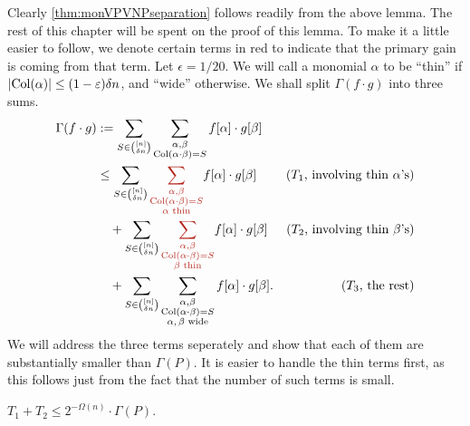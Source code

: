Clearly \autoref{thm:monVPVNPseparation} follows readily from the above lemma.
The rest of this chapter will be spent on the proof of this lemma. To make it a little easier to follow, we denote certain terms in \textcolor{BrickRed}{red} to indicate that the primary gain is coming from that term.
Let $\epsilon = 1/20$. We will call a monomial $\alpha$ to be ``thin'' if $\left|\operatorname{Col}(\alpha)\right| \leq (1-\varepsilon) \delta n$, and ``wide'' otherwise.
We shall split $\Gamma(f \cdot g)$ into three sums.
\begin{align*}
  \Gamma(f \cdot g) & :=   \sum_{S \in \binom{[n]}{\delta n}} \sum_{\substack{\alpha, \beta\\ \Col(\alpha \cdot \beta) = S}} f[\alpha] \cdot g[\beta]\\
                    & \leq \sum_{S \in \binom{[n]}{\delta n}} \textcolor{BrickRed}{\sum_{\substack{\alpha, \beta\\ \Col(\alpha \cdot \beta) = S \\ \text{$\alpha$ thin}}}} f[\alpha] \cdot g[\beta] & \text{($T_1$, involving thin $\alpha$'s)}\\
                    & \quad + \sum_{S \in \binom{[n]}{\delta n}} \textcolor{BrickRed}{\sum_{\substack{\alpha, \beta\\ \Col(\alpha \cdot \beta) = S \\ \text{$\beta$ thin}}}} f[\alpha] \cdot g[\beta] & \text{($T_2$, involving thin $\beta$'s)}\\
                    & \quad + \sum_{S \in \binom{[n]}{\delta n}} \sum_{\substack{\alpha, \beta\\ \Col(\alpha \cdot \beta) = S \\ \text{$\alpha,\beta$ wide}}} f[\alpha] \cdot g[\beta]. & \text{($T_3$, the rest)}
\end{align*}
We will address the three terms seperately and show that each of them are substantially smaller than $\Gamma(P)$.
It is easier to handle the thin terms first, as this follows just from the fact that the number of such terms is small.
\begin{claim}
  $T_1 + T_2 \leq 2^{-\Omega(n)} \cdot \Gamma(P)$.
\end{claim}
